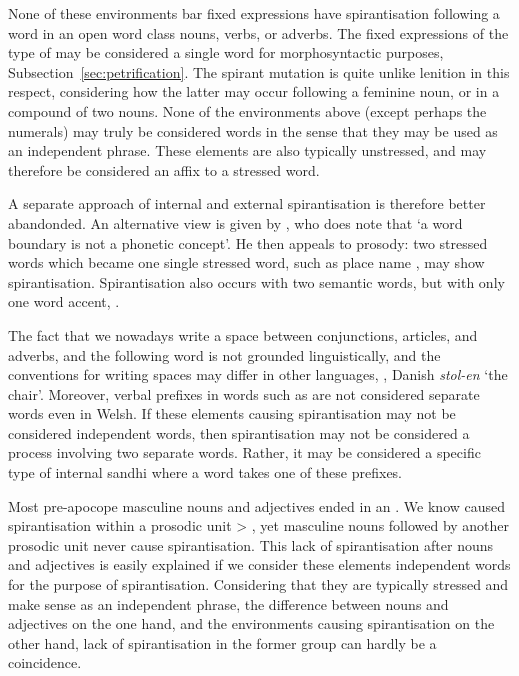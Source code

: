 None of these environments bar fixed expressions have spirantisation following a word in an open word class \ie nouns, verbs, or adverbs.
The fixed expressions of the type of  may be considered a single word for morphosyntactic purposes, \cf Subsection~\ref{sec:petrification}.
The spirant mutation is quite unlike lenition in this respect, considering how the latter may occur \eg following a feminine noun, or in a compound of two nouns. None of the environments above (except perhaps the numerals) may truly be considered words in the sense that they may be used as an independent phrase.
These elements are also typically unstressed, and may therefore be considered an affix to a stressed word.

A separate approach of internal and external spirantisation is therefore better abandonded. An alternative view is given by \textcite[126--129]{koch_neo-brittonic_1989}, who does note that `a word boundary is not a phonetic concept'.
He then appeals to prosody: two stressed words which became one single stressed word, such as place name , may show spirantisation.
Spirantisation also occurs with two semantic words, but with only one word accent, \eg {}.

The fact that we nowadays write a space between conjunctions, articles, and adverbs, \etc and the following word is not grounded linguistically, and the conventions for writing spaces may differ in other languages, \eg {}, Danish \textit{stol-en} `the chair'.
Moreover, verbal prefixes in words such as  are not considered separate words even in Welsh.
If  these elements causing spirantisation may not be considered independent words, then spirantisation may not be considered a process involving two separate words.
Rather, it may be considered a specific type of internal sandhi where a word takes one of these prefixes.

Most pre-apocope masculine  nouns and adjectives ended in an .
We know  caused spirantisation within a prosodic unit \eg {} > , yet masculine nouns followed by another prosodic unit never cause spirantisation.
This lack of spirantisation after nouns and adjectives is easily explained if we consider these elements independent words for the purpose of spirantisation.
Considering that they are typically stressed and make sense as an independent phrase, the difference between nouns and adjectives on the one hand, and the environments causing spirantisation on the other hand, lack of spirantisation in the former group can hardly be a coincidence.

